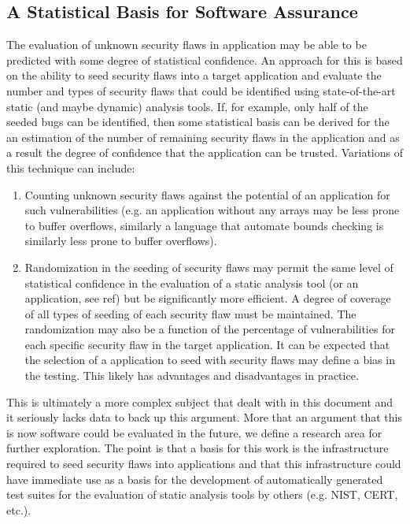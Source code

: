 \subsection{A Statistical Basis for Software Assurance}
\label{sec:NewResearchArea}
    The evaluation of unknown security flaws in application may be able to
be predicted with some degree of statistical confidence.  An approach for this
is based on the ability to seed security flaws into a target application and 
evaluate the number and types of security flaws that could be identified
using state-of-the-art static (and maybe dynamic) analysis tools.  If, for example,
only half of the seeded bugs can be identified, then some statistical basis
can be derived for the an estimation of the number of remaining security flaws in 
the application and as a result the degree of confidence that the application 
can be trusted.  Variations of this technique can include:
\begin{enumerate}
   \item Counting unknown security flaws against the potential of an application for such
         vulnerabilities (e.g. an application without any arrays may be less prone to
         buffer overflows, similarly a language that automate bounds checking is similarly
         less prone to buffer overflows). 

   \item Randomization in the seeding of security flaws may permit the same level of
         statistical confidence in the evaluation of a static analysis tool (or an
         application, see ref{}) but be significantly more efficient.  A degree of
         coverage of all types of seeding of each security flaw must be maintained.
         The randomization may also be a function of the percentage of vulnerabilities 
         for each specific security flaw in the target application.  It can be expected
         that the selection of a application to seed with security flaws may define a 
         bias in the testing.  This likely has advantages and disadvantages in practice.
 
\end{enumerate}

This is ultimately a more complex subject that dealt with in this
document and it seriously lacks data to back up this argument.  More that an argument
that this is now software could be evaluated in the future, we define a research
area for further exploration.  The point is that a basis for this work is the
infrastructure required to seed security flaws into applications and that 
this infrastructure could have immediate use as a basis for the development of
automatically generated test suites for the evaluation of static analysis tools
by others (e.g. NIST, CERT, etc.).



